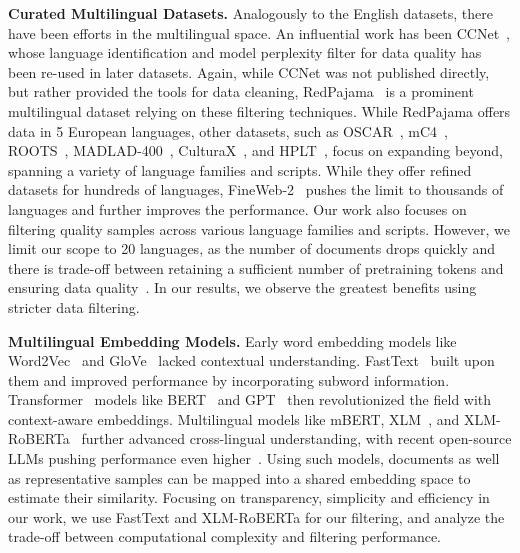 \textbf{Curated Multilingual Datasets.} Analogously to the English datasets, there have been efforts in the multilingual space. An influential work has been CCNet~\citep{wenzek2019ccnet}, whose language identification and model perplexity filter for data quality has been re-used in later datasets. Again, while CCNet was not published directly, but rather provided the tools for data cleaning, RedPajama~\citep{together2023redpajama} is a prominent multilingual dataset relying on these filtering techniques. While RedPajama offers data in 5 European languages, other datasets, such as OSCAR~\citep{OrtizSuarezSagotRomary2019,AbadjiOrtizSuarezRomaryetal.2021,2022arXiv220106642A}, mC4~\citep{xue-etal-2021-mt5}, ROOTS~\citep{laurenccon2022bigscience}, MADLAD-400~\citep{kudugunta2023madlad400multilingualdocumentlevellarge}, CulturaX~\citep{nguyen2023culturax}, and HPLT~\citep{de-gibert-etal-2024-new-massive}, focus on expanding beyond, spanning a variety of language families and scripts. While they offer refined datasets for hundreds of languages, FineWeb-2~\citep{penedo2024fineweb-2} pushes the limit to thousands of languages and further improves the performance. Our work also focuses on filtering quality samples across various language families and scripts. However, we limit our scope to 20 languages, as the number of documents drops quickly and there is trade-off between retaining a sufficient number of pretraining tokens and ensuring data quality~\citep{muennighoff2023scalingdataconstrainedlanguagemodels, held2025optimizing}.
In our results, we observe the greatest benefits using stricter data filtering.

\textbf{Multilingual Embedding Models.} Early word embedding models like Word2Vec~\citep{mikolov2013efficientestimationwordrepresentations} and GloVe~\citep{pennington-etal-2014-glove} lacked contextual understanding. FastText~\citep{bojanowski2017enrichingwordvectorssubword} built upon them and improved performance by incorporating subword information. Transformer~\citep{vaswani2023attentionneed} models like BERT~\citep{devlin2019bertpretrainingdeepbidirectional} and GPT~\citep{radford2018improving} then revolutionized the field with context-aware embeddings. Multilingual models like mBERT, XLM~\citep{lample2019crosslinguallanguagemodelpretraining}, and XLM-RoBERTa~\citep{conneau2020unsupervisedcrosslingualrepresentationlearning} further advanced cross-lingual understanding, with recent open-source LLMs pushing performance even higher~\citep{llama3, mistral_small3_blog}. Using such models,  documents as well as representative samples can be mapped into a shared embedding space to estimate their similarity. Focusing on transparency, simplicity and efficiency in our work, we use FastText and XLM-RoBERTa for our %
filtering, and analyze the trade-off between computational complexity and filtering performance.


